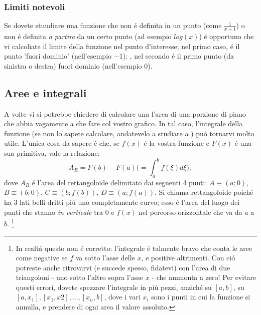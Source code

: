 \subsubsection{Limiti notevoli}
Se dovete stuudiare una funzione che non \'e definita in un punto (come $\frac{1}{x+1}$) o non \'e definita {\em a partire} da un certo punto (ad esempio $log(x)$) \'e opportuno
che vi calcoliate il limite della funzione nel punto d'interesse; nel primo caso, \'e il punto 'fuori dominio' (nell'esempio $-1$): , nel secondo \'e il primo punto (da sinistra o destra) fuori dominio (nell'esempio $0$).

\subsection{Aree e integrali}
A volte vi si potrebbe chiedere di calcolare una l'area di una porzione di piano che abbia vagamente a che fare col vostro grafico. In tal caso, l'integrale della funzione
(se non lo sapete calcolare, andatevelo a studiare a ) pu\'o tornarvi molto utile. L'unica cosa da sapere \'e che, se $f(x)$ \'e la vostra funzione
e $F(x)$ \'e una sua primitiva, vale la relazione:
 \begin{equation}
  A_R=F(b)-F(a) \bigg( = \int_a^b f(\xi)d\xi \bigg),
 \end{equation}
dove $A_R$ \'e l'area del rettangoloide delimitato dai seguenti 4 punti: $A \equiv (a;0)$, $B \equiv (b;0)$, $C \equiv (b;f(b))$, $D \equiv (a;f(a))$. Si chiama rettangoloide
poich\'e ha 3 lati belli dritti pi\'u uno completamente curvo; esso \'e l'area del luogo dei punti che stanno {\em in verticale} tra $0$ e $f(x)$ nel percorso orizzontale che
va da $a$ a $b$. 
\footnote{In realt\'a questo non \'e corretto: l'integrale \'e talmente bravo che conta le aree come negative se $f$ va sotto l'asse delle $x$, e positive altrimenti. 
Con ci\'o potreste anche ritrovarvi (e succede spesso, fidatevi) con l'area di due triangoloni - uno sotto l'altro sopra l'asse $x$ - che ammonta a zero! Per evitare questi
errori, dovete spezzare l'integrale in pi\'u pezzi, anzich\'e su $[a,b]$, su $[a,x_1],[x_1,x2],...,[x_n,b]$, dove i vari $x_i$ sono i punti in cui la funzione si annulla, e prendere di ogni area il valore assoluto.}




